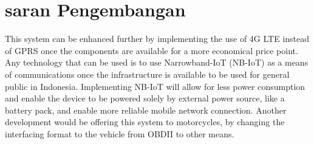 \documentclass[conference]{IEEEtran}
\begin{document}
\section{saran Pengembangan}
This system can be enhanced further by implementing the use of 4G LTE instead of GPRS once the components are available for a more economical price point. Any technology that can be used is to use Narrowband-IoT (NB-IoT) as a means of communications once the infrastructure is available to be used for general public in Indonesia. Implementing NB-IoT will allow for less power consumption and enable the device to be powered solely by external power source, like a battery pack, and enable more reliable mobile network connection. Another development would be offering this system to motorcycles, by changing the interfacing format to the vehicle from OBDII to other means.




\end{document}
